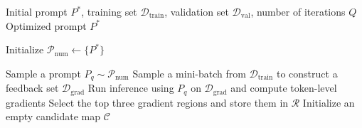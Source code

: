 \documentclass[12pt]{article}
\begin{document}
\begin{algorithm}
\caption{Numeric Gradient Update}
\label{alg:numeric-gradient}
\begin{algorithmic}[1]
\Require Initial prompt $P^{*}$, training set $\mathcal{D}_{\mathrm{train}}$, validation set $\mathcal{D}_{\mathrm{val}}$, number of iterations $Q$
\Ensure Optimized prompt $P^{*}$

\State Initialize $\mathcal{P}_{\text{num}} \gets \{P^{*}\}$

 
    \State Sample a prompt $P_q \sim \mathcal{P}_{\text{num}}$
    \State Sample a mini-batch from $\mathcal{D}_{\mathrm{train}}$ to construct a feedback set $\mathcal{D}_{\mathrm{grad}}$
    \State Run inference using $P_q$ on $\mathcal{D}_{\mathrm{grad}}$ and compute token-level gradients
    \State Select the top three gradient regions and store them in $\mathcal{R}$ 
    \State Initialize an empty candidate map $\mathcal{C}$ 


\end{algorithmic}
\end{algorithm}
\end{document}
